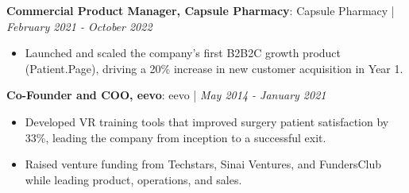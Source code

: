 \documentclass[10pt,a4paper,withhyper]{altacv}
\newcommand{\atscvevent}[4]{%
  \textbf{#1}: #2 | \textit{#3}%
  \vspace{0.3em}%
}
\begin{document}
\atscvevent{Commercial Product Manager, Capsule Pharmacy}{Capsule Pharmacy}{February 2021 - October 2022}{}
\begin{itemize}
\item Launched and scaled the company's first B2B2C growth product (Patient.Page), driving a 20\% increase in new customer acquisition in Year 1.
\end{itemize}

\atscvevent{Co-Founder and COO, eevo}{eevo}{May 2014 - January 2021}{}
\begin{itemize}
\item Developed VR training tools that improved surgery patient satisfaction by 33\%, leading the company from inception to a successful exit.
\item Raised venture funding from Techstars, Sinai Ventures, and FundersClub while leading product, operations, and sales.
\end{itemize}


\end{document}
